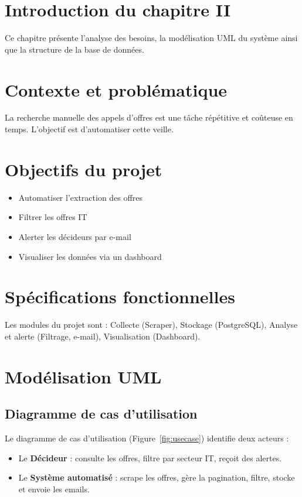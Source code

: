 \documentclass[12pt,a4paper]{report}
\begin{document}
\section*{Introduction du chapitre II}

Ce chapitre présente l'analyse des besoins, la modélisation UML du système ainsi que la structure de la base de données.

\section{Contexte et problématique}

La recherche manuelle des appels d'offres est une tâche répétitive et coûteuse en temps. L'objectif est d'automatiser cette veille.

\section{Objectifs du projet}

\begin{itemize}
\item Automatiser l'extraction des offres
\item Filtrer les offres IT
\item Alerter les décideurs par e-mail
\item Visualiser les données via un dashboard
\end{itemize}

\section{Spécifications fonctionnelles}

Les modules du projet sont : Collecte (Scraper), Stockage (PostgreSQL), Analyse et alerte (Filtrage, e-mail), Visualisation (Dashboard).

\section{Modélisation UML}

\subsection{Diagramme de cas d'utilisation}

Le diagramme de cas d'utilisation (Figure~\ref{fig:usecase}) identifie deux acteurs :
\begin{itemize}
\item Le \textbf{Décideur} : consulte les offres, filtre par secteur IT, reçoit des alertes.
\item Le \textbf{Système automatisé} : scrape les offres, gère la pagination, filtre, stocke et envoie les emails.
\end{itemize}
\end{document}
